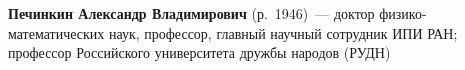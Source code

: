 \begin{multicols}{2}







\noindent
\textbf{Печинкин Александр Владимирович} (р.\ 1946)~--- доктор физико-математических наук,
профессор, главный научный сотрудник ИПИ РАН; профессор Российского университета
дружбы народов (РУДН)








\vspace*{9pt}


\end{multicols}

